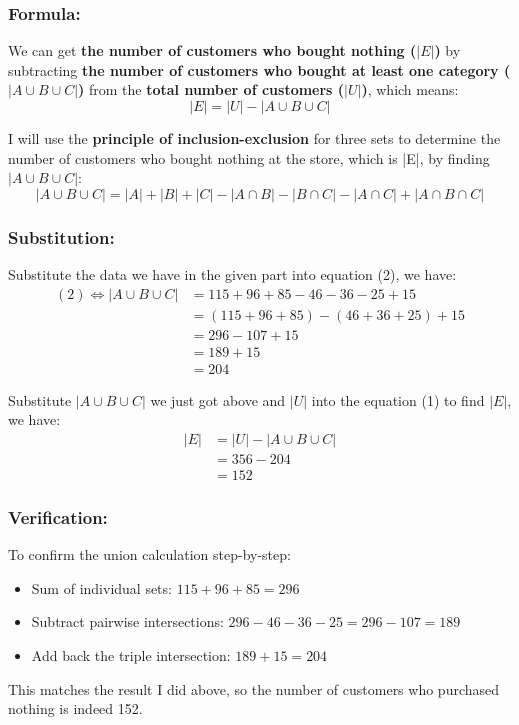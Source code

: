 \documentclass[12pt, a4paper, twoside]{report} %
\begin{document}
\subsubsection*{Formula:}
  We can get \textbf{the number of customers who bought nothing ($|E|$)} by subtracting \textbf{the number of customers who bought at least one category ($|A \cup B \cup C|$)} from the \textbf{total number of customers ($|U|$)}, which means:
  \[
  |E| = |U| - |A \cup B \cup C| \tag{1}
  \]

  I will use the \textbf{principle of inclusion-exclusion} for three sets to determine the number of customers who bought nothing at the store, which is |E|, by finding $|A \cup B \cup C|$:
    \[
    |A \cup B \cup C| = |A| + |B|+|C| - |A \cap B| - |B \cap C| - |A \cap C| + |A \cap B \cap C| \tag{2}
    \]

\subsubsection*{Substitution:}
  Substitute the data we have in the given part into equation (2), we have:
  \begin{align*}
    (2) \Leftrightarrow |A \cup B \cup C| &= 115 + 96 + 85 - 46 - 36 - 25 + 15 \\
                      &= (115 + 96 + 85) - (46 + 36 + 25) + 15 \\
                      &= 296 - 107 + 15 \\
                      &= 189 + 15 \\
                      &= 204
  \end{align*}

  Substitute $|A \cup B \cup C|$ we just got above and $|U|$ into the equation (1) to find $|E|$, we have:
  \begin{align*}
    |E| &= |U| - |A \cup B \cup C| \\
        &= 356 - 204  \\
        &= 152
  \end{align*}

\subsubsection*{Verification:}
To confirm the union calculation step-by-step:
\begin{itemize}
  \item Sum of individual sets: $115 + 96 + 85 = 296$
  \item Subtract pairwise intersections: $296 - 46 - 36 - 25 = 296 - 107 = 189$
  \item Add back the triple intersection: $189 + 15 = 204$
\end{itemize}
This matches the result I did above, so the number of customers who purchased nothing is indeed 152.
\end{document}
